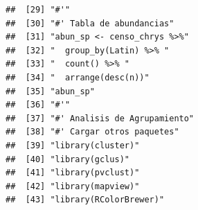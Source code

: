 \documentclass[11pt,]{article}
\begin{document}
\begin{verbatim}
##  [29] "#'"                                                                                                                                                                    
##  [30] "#' Tabla de abundancias"                                                                                                                                               
##  [31] "abun_sp <- censo_chrys %>%"                                                                                                                                            
##  [32] "  group_by(Latin) %>% "                                                                                                                                                
##  [33] "  count() %>% "                                                                                                                                                        
##  [34] "  arrange(desc(n))"                                                                                                                                                    
##  [35] "abun_sp"                                                                                                                                                               
##  [36] "#'"                                                                                                                                                                    
##  [37] "#' Analisis de Agrupamiento"                                                                                                                                           
##  [38] "#' Cargar otros paquetes"                                                                                                                                              
##  [39] "library(cluster)"                                                                                                                                                      
##  [40] "library(gclus)"                                                                                                                                                        
##  [41] "library(pvclust)"                                                                                                                                                      
##  [42] "library(mapview)"                                                                                                                                                      
##  [43] "library(RColorBrewer)"                                                                                                                                                 

\end{verbatim}
\end{document}

